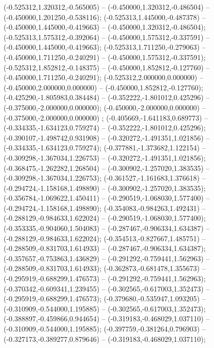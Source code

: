  (-0.525312,1.320312,-0.565005) -- (-0.450000,1.320312,-0.486504) -- (-0.450000,1.201250,-0.538116);
 (-0.525313,1.445000,-0.487378) -- (-0.450000,1.445000,-0.419663) -- (-0.450000,1.320312,-0.486504);
 (-0.525313,1.575312,-0.392064) -- (-0.450000,1.575312,-0.337591) -- (-0.450000,1.445000,-0.419663);
 (-0.525313,1.711250,-0.279063) -- (-0.450000,1.711250,-0.240291) -- (-0.450000,1.575312,-0.337591);
 (-0.525312,1.852812,-0.148375) -- (-0.450000,1.852812,-0.127760) -- (-0.450000,1.711250,-0.240291);
 (-0.525312,2.000000,0.000000) -- (-0.450000,2.000000,0.000000) -- (-0.450000,1.852812,-0.127760);
 (-0.425290,-1.805983,0.384484) -- (-0.352222,-1.801012,0.425296) -- (-0.375000,-2.000000,0.000000);
 (-0.450000,-2.000000,0.000000) -- (-0.375000,-2.000000,0.000000) ;
 (-0.405669,-1.641183,0.689773) -- (-0.334335,-1.634123,0.759274) -- (-0.352222,-1.801012,0.425296);
 (-0.390107,-1.498742,0.931908) -- (-0.320272,-1.491351,1.021856) -- (-0.334335,-1.634123,0.759274);
 (-0.377881,-1.373682,1.122154) -- (-0.309298,-1.367034,1.226753) -- (-0.320272,-1.491351,1.021856);
 (-0.368475,-1.262282,1.268504) -- (-0.300902,-1.257020,1.383535) -- (-0.309298,-1.367034,1.226753);
 (-0.361527,-1.161683,1.376618) -- (-0.294724,-1.158168,1.498890) -- (-0.300902,-1.257020,1.383535);
 (-0.356784,-1.069622,1.450411) -- (-0.290519,-1.068030,1.577400) -- (-0.294724,-1.158168,1.498890);
 (-0.354083,-0.984263,1.492431) -- (-0.288129,-0.984633,1.622024) -- (-0.290519,-1.068030,1.577400);
 (-0.353335,-0.904060,1.504083) -- (-0.287467,-0.906334,1.634387) -- (-0.288129,-0.984633,1.622024);
 (-0.354513,-0.827667,1.485751) -- (-0.288509,-0.831703,1.614933) -- (-0.287467,-0.906334,1.634387);
 (-0.357657,-0.753863,1.436829) -- (-0.291292,-0.759441,1.562963) -- (-0.288509,-0.831703,1.614933);
 (-0.362873,-0.681478,1.355673) -- (-0.295919,-0.688299,1.476573) -- (-0.291292,-0.759441,1.562963);
 (-0.370342,-0.609341,1.239455) -- (-0.302565,-0.617003,1.352473) -- (-0.295919,-0.688299,1.476573);
 (-0.379680,-0.535947,1.093205) -- (-0.310909,-0.544000,1.195885) -- (-0.302565,-0.617003,1.352473);
 (-0.388897,-0.459866,0.944654) -- (-0.319183,-0.468029,1.037110) -- (-0.310909,-0.544000,1.195885);
 (-0.397759,-0.381264,0.796903) -- (-0.327173,-0.389277,0.879646) -- (-0.319183,-0.468029,1.037110);

